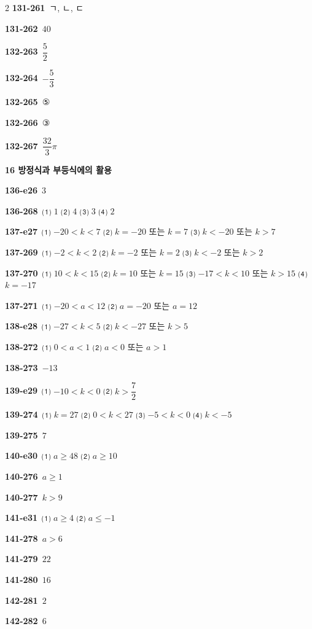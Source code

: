 \documentclass[10pt,a4paper]{article}
\begin{document}
\begin{multicols}{2}
\noindent\textbf{131-261}\ ㄱ, ㄴ, ㄷ\par
\noindent\textbf{131-262}\ $40$\par
\noindent\textbf{132-263}\ $\dfrac{5}{2}$\par
\noindent\textbf{132-264}\ $-\dfrac{5}{3}$\par
\noindent\textbf{132-265}\ ⑤\par
\noindent\textbf{132-266}\ ③\par
\noindent\textbf{132-267}\ $\dfrac{32}{3}\pi$\par
\noindent\textbf{16 방정식과 부등식에의 활용}\par\smallskip
\noindent\textbf{136-e26}\ $3$\par
\noindent\textbf{136-268}\ ⑴ $1$ ⑵ $4$ ⑶ $3$ ⑷ $2$\par
\noindent\textbf{137-e27}\ ⑴ $-20<k<7$ ⑵ $k=-20$ 또는 $k=7$ ⑶ $k<-20$ 또는 $k>7$\par
\noindent\textbf{137-269}\ ⑴ $-2<k<2$ ⑵ $k=-2$ 또는 $k=2$ ⑶ $k<-2$ 또는 $k>2$\par
\noindent\textbf{137-270}\ ⑴ $10<k<15$ ⑵ $k=10$ 또는 $k=15$ ⑶ $-17<k<10$ 또는 $k>15$ ⑷ $k=-17$\par
\noindent\textbf{137-271}\ ⑴ $-20<a<12$ ⑵ $a=-20$ 또는 $a=12$\par
\noindent\textbf{138-e28}\ ⑴ $-27<k<5$ ⑵ $k<-27$ 또는 $k>5$\par
\noindent\textbf{138-272}\ ⑴ $0<a<1$ ⑵ $a<0$ 또는 $a>1$\par
\noindent\textbf{138-273}\ $-13$\par
\noindent\textbf{139-e29}\ ⑴ $-10<k<0$ ⑵ $k>\dfrac{7}{2}$\par
\noindent\textbf{139-274}\ ⑴ $k=27$ ⑵ $0<k<27$ ⑶ $-5<k<0$ ⑷ $k<-5$\par
\noindent\textbf{139-275}\ $7$\par
\noindent\textbf{140-e30}\ ⑴ $a\ge 48$ ⑵ $a\ge 10$\par
\noindent\textbf{140-276}\ $a\ge 1$\par
\noindent\textbf{140-277}\ $k>9$\par
\noindent\textbf{141-e31}\ ⑴ $a\ge 4$ ⑵ $a\le -1$\par
\noindent\textbf{141-278}\ $a>6$\par
\noindent\textbf{141-279}\ $22$\par
\noindent\textbf{141-280}\ $16$\par
\noindent\textbf{142-281}\ $2$\par
\noindent\textbf{142-282}\ $6$\par

\end{multicols}
\end{document}
